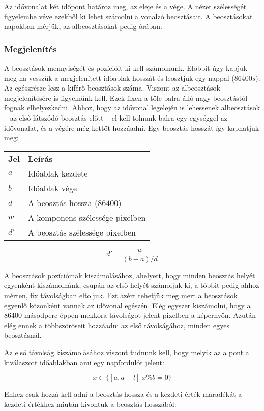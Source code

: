 Az idővonalat két időpont határoz meg, az eleje és a vége. A nézet szélességét figyelembe véve ezekből ki lehet számolni a vonalzó beosztásait. A beosztásokat napokban mérjük, az albeosztásokat pedig órában.

\subsubsection{Megjelenítés}

A beosztások mennyiségét és pozícióit ki kell számolnunk. Előbbit úgy kapjuk meg ha vesszük a megjelenített időablak hosszát és leosztjuk egy nappal ($86400s$). Az egészrésze lesz a kiférő beosztások száma. Viszont az albeosztások megjelenítésére is figyelnünk kell. Ezek fixen a tőle balra álló nagy beosztástól fognak elhelyezkedni. Ahhoz, hogy az idővonal legelején is lehessenek albeosztások -- az első látszódó beosztás előtt -- el kell tolnunk balra egy egységgel az idővonalat, és a végére még kettőt hozzáadni. Egy beosztás hosszát így kaphatjuk meg:

\begin{tabular}{@{}ll@{}}
	\textbf{Jel} & \textbf{Leírás} \\
	$a$ & Időablak kezdete \\
	$b$ & Időablak vége \\
	$d$ & A beosztás hossza ($86400$) \\
	$w$ & A komponens szélessége pixelben \\
	$d'$ & A beosztás szélessége pixelben \\
\end{tabular}
$$d' = \frac{w}{(b - a) / d}$$

A beosztások pozícióinak kiszámolásához, ahelyett, hogy minden beosztás helyét egyenként kiszámolnánk, csupán az első helyét számoljuk ki, a többit pedig ahhoz mérten, fix távolságban eltoljuk. Ezt azért tehetjük meg mert a beosztások egyenlő közönként vannak az idővonal egészén. Elég egyszer kiszámolni, hogy a $86400$ másodperc éppen mekkora távolságot jelent pixelben a képernyőn. Azután elég ennek a többszöröseit hozzáadni az első távolságához, minden egyes beosztásnál.

Az első távolság kiszámolásához viszont tudnunk kell, hogy melyik az a pont a kiválaszott időablakban ami egy napfordulót jelent:

$$ x \in \{[a, a+l] | x \% b = 0\} $$

Ehhez csak hozzá kell adni a beosztás hossza és a kezdeti érték maradékát a kezdeti értékhez miután kivontuk a beosztás hosszából:

